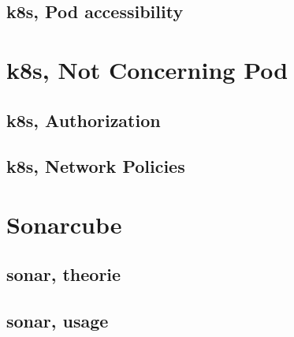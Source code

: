 \documentclass[8pt]{beamer}
\begin{document}



\subsection{k8s, Pod accessibility}




\section{k8s, Not Concerning Pod}
\subsection{k8s, Authorization}




\subsection{k8s, Network Policies}



\section{Sonarcube}

\subsection{sonar, theorie}




\subsection{sonar, usage}




\end{document}
